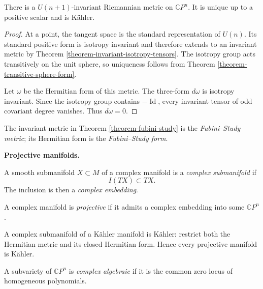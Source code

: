 \begin{theorem}
\label{theorem-fubini-study}
There is a $U(n+1)$-invariant Riemannian
metric on $\mathbb{C}P^n$. It is unique up
to a positive scalar and is K\"ahler.
\end{theorem}

\begin{proof}
At a point, the tangent space is the standard
representation of $U(n)$. Its standard
positive form is isotropy invariant and
therefore extends to an invariant metric by
Theorem
\ref{theorem-invariant-isotropy-tensors}.
The isotropy group acts transitively on the
unit sphere, so uniqueness follows from
Theorem \ref{theorem-transitive-sphere-form}.

Let $\omega$ be the Hermitian form of this
metric. The three-form $d\omega$ is
isotropy invariant. Since the isotropy group
contains $-\operatorname{Id}$, every
invariant tensor of odd covariant degree
vanishes. Thus $d\omega=0$.
\end{proof}

\begin{definition}
\label{definition-fubini-study}
The invariant metric in Theorem
\ref{theorem-fubini-study} is the
{\it Fubini--Study metric}; its Hermitian
form is the {\it Fubini--Study form}.
\end{definition}

\medskip\noindent
{\bf Projective manifolds.}

\begin{definition}
\label{definition-complex-submanifold}
A smooth submanifold $X\subset M$ of a
complex manifold is a
{\it complex submanifold} if
$$
I(TX)\subset TX.
$$
The inclusion is then a
{\it complex embedding}.
\end{definition}

\begin{definition}
\label{definition-projective-manifold}
A complex manifold is {\it projective} if
it admits a complex embedding into some
$\mathbb{C}P^n$.
\end{definition}

A complex submanifold of a K\"ahler manifold
is K\"ahler: restrict both the Hermitian
metric and its closed Hermitian form. Hence
every projective manifold is K\"ahler.

\begin{definition}
\label{definition-projective-algebraic}
A subvariety of $\mathbb{C}P^n$ is
{\it complex algebraic} if it is the common
zero locus of homogeneous polynomials.
\end{definition}

